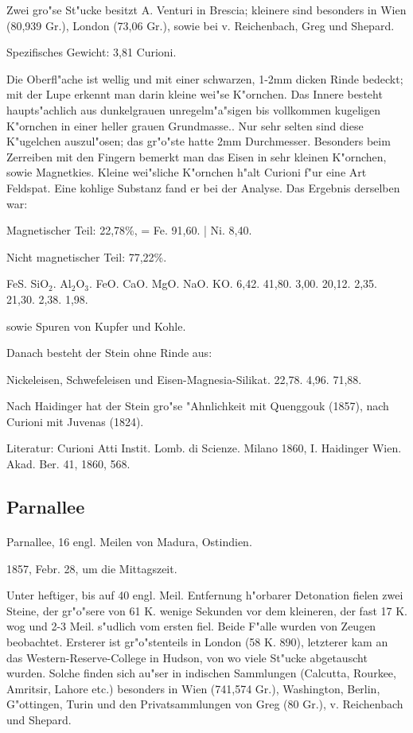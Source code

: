 \documentclass[a4paper, 11pt, oneside]{article}
\begin{document}
Zwei gro"se St"ucke besitzt A. Venturi in Brescia; kleinere sind besonders in Wien (80,939 Gr.), London (73,06 Gr.), sowie bei v. Reichenbach, Greg und Shepard.

Spezifisches Gewicht: 3,81 Curioni.

Die Oberfl"ache ist wellig und mit einer schwarzen, 1-2mm dicken Rinde bedeckt; mit der Lupe erkennt man darin kleine wei"se K"ornchen. Das Innere besteht haupts"achlich aus dunkelgrauen unregelm"a"sigen bis vollkommen kugeligen K"ornchen in einer heller grauen Grundmasse.. Nur sehr selten sind diese K"ugelchen auszul"osen; das gr"o"ste hatte 2mm Durchmesser. Besonders beim Zerreiben mit den Fingern bemerkt man das Eisen in sehr kleinen K"ornchen, sowie Magnetkies. Kleine wei"sliche K"ornchen h"alt Curioni f"ur eine Art Feldspat. Eine kohlige Substanz fand er bei der Analyse. Das Ergebnis derselben war:

Magnetischer Teil: 22,78\%, = Fe. 91,60. | Ni. 8,40.

Nicht magnetischer Teil: 77,22\%.

FeS. SiO$_{2}$. Al$_{2}$O$_{3}$. FeO. CaO. MgO. NaO. KO.  
6,42. 41,80. 3,00. 20,12. 2,35. 21,30. 2,38. 1,98.

sowie Spuren von Kupfer und Kohle.

Danach besteht der Stein ohne Rinde aus:

Nickeleisen, Schwefeleisen und Eisen-Magnesia-Silikat.  
22,78. 4,96. 71,88.

Nach Haidinger hat der Stein gro"se "Ahnlichkeit mit Quenggouk (1857), nach Curioni mit Juvenas (1824).

\footnotesize
Literatur: Curioni Atti Instit. Lomb. di Scienze. Milano 1860, I. Haidinger Wien. Akad. Ber. 41, 1860, 568.

\subsection{Parnallee}
\normalsize
\paragraph{}
Parnallee, 16 engl. Meilen von Madura, Ostindien.

1857, Febr. 28, um die Mittagszeit.

Unter heftiger, bis auf 40 engl. Meil. Entfernung h"orbarer Detonation fielen zwei Steine, der gr"o"sere von 61 K. wenige Sekunden vor dem kleineren, der fast 17 K. wog und 2-3 Meil. s"udlich vom ersten fiel. Beide F"alle wurden von Zeugen beobachtet. Ersterer ist gr"o"stenteils in London (58 K. 890), letzterer kam an das Western-Reserve-College in Hudson, von wo viele St"ucke abgetauscht wurden. Solche finden sich au"ser in indischen Sammlungen (Calcutta, Rourkee, Amritsir, Lahore etc.) besonders in Wien (741,574 Gr.), Washington, Berlin, G"ottingen, Turin und den Privatsammlungen von Greg (80 Gr.), v. Reichenbach und Shepard.
\end{document}
